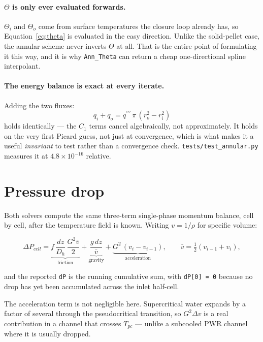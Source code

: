 \documentclass[11pt]{article}
\newcommand{\code}[1]{\texttt{#1}}
\newcommand{\qppp}{q^{\prime\prime\prime}}
\begin{document}
\paragraph{$\Theta$ is only ever evaluated forwards.} $\Theta_i$ and $\Theta_o$ come
from surface temperatures the closure loop already has, so
Equation~\eqref{eq:theta} is evaluated in the easy direction. Unlike the solid-pellet
case, the annular scheme never inverts $\Theta$ at all. That is the entire point of
formulating it this way, and it is why \code{Ann\_Theta} can return a cheap
one-directional spline interpolant.

\paragraph{The energy balance is exact at every iterate.} Adding the two fluxes:
\begin{equation}
q_i + q_o = \qppp\,\pi\,(r_o^2 - r_i^2)
\end{equation}
holds identically --- the $C_1$ terms cancel algebraically, not approximately. It holds
on the very first Picard guess, not just at convergence, which is what makes it a useful
\emph{invariant} to test rather than a convergence check. \code{tests/test\_annular.py}
measures it at $4.8\times10^{-16}$ relative.

\section{Pressure drop}
\label{sec:dp}

Both solvers compute the same three-term single-phase momentum balance, cell by cell,
after the temperature field is known. Writing $v = 1/\rho$ for specific volume:

\begin{equation}
\Delta P_{cell} =
\underbrace{f\,\frac{dz}{D_h}\,\frac{G^2 \bar v}{2}}_{\text{friction}}
+ \underbrace{\frac{g\,dz}{\bar v}}_{\text{gravity}}
+ \underbrace{G^2\,(v_i - v_{i-1})}_{\text{acceleration}},
\qquad \bar v = \tfrac{1}{2}(v_{i-1} + v_i),
\end{equation}

and the reported \code{dP} is the running cumulative sum, with \code{dP[0] = 0} because
no drop has yet been accumulated across the inlet half-cell.

The acceleration term is not negligible here. Supercritical water expands by a factor of
several through the pseudocritical transition, so $G^2\Delta v$ is a real contribution
in a channel that crosses $T_{pc}$ --- unlike a subcooled PWR channel where it is
usually dropped.
\end{document}
